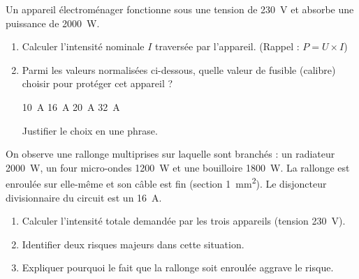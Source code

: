 \documentclass[11pt]{article}
\begin{document}
\begin{exercice}
Un appareil électroménager fonctionne sous une tension de \SI{230}{\volt} et absorbe une puissance de \SI{2000}{\watt}.
\begin{enumerate}
    \item Calculer l'intensité nominale $I$ traversée par l'appareil. (Rappel : $P = U \times I$)
    \item Parmi les valeurs normalisées ci-dessous, quelle valeur de fusible (calibre) choisir pour protéger cet appareil ?
    \begin{center}
    \SI{10}{\ampere} \quad \SI{16}{\ampere} \quad \SI{20}{\ampere} \quad \SI{32}{\ampere}
    \end{center}
    Justifier le choix en une phrase.
\end{enumerate}
\end{exercice}

\begin{exercice}
On observe une rallonge multiprises sur laquelle sont branchés : un radiateur \SI{2000}{\watt}, un four micro-ondes \SI{1200}{\watt} et une bouilloire \SI{1800}{\watt}. La rallonge est enroulée sur elle-même et son câble est fin (section \SI{1}{\milli\meter\squared}). Le disjoncteur divisionnaire du circuit est un \SI{16}{\ampere}.
\begin{enumerate}
    \item Calculer l'intensité totale demandée par les trois appareils (tension \SI{230}{\volt}).
    \item Identifier deux risques majeurs dans cette situation.
    \item Expliquer pourquoi le fait que la rallonge soit enroulée aggrave le risque.
\end{enumerate}
\end{exercice}
\end{document}
